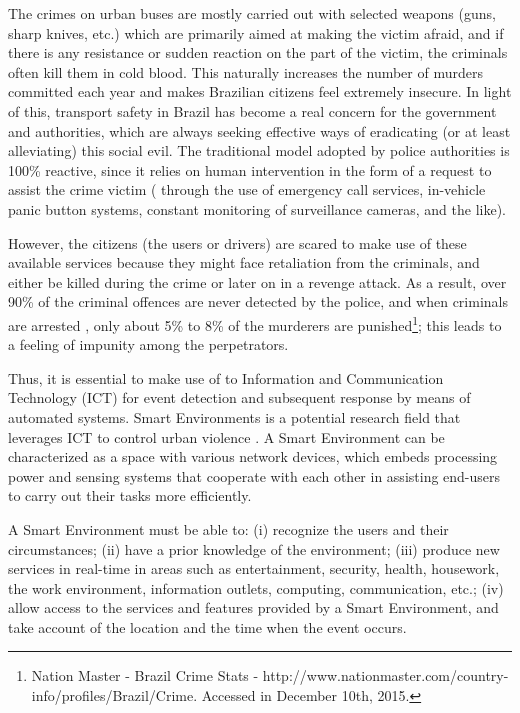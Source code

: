 The crimes on urban buses are mostly carried out with selected weapons (guns, sharp knives, etc.) which are primarily aimed at making the victim afraid, and if there is any resistance or sudden reaction on the part of the victim, the criminals often kill them in cold blood. This naturally increases the number of murders committed each year and makes Brazilian citizens feel extremely insecure. In light of this, transport safety in Brazil has become a real concern for the government and authorities, which are always seeking effective ways of eradicating (or at least alleviating) this social evil. The traditional model adopted by police authorities is 100\% reactive, since it relies on human intervention in the form of a request to assist the crime victim ( through the use of emergency call services, in-vehicle panic button systems, constant monitoring of surveillance cameras, and the like). 

However, the citizens (the users or drivers) are scared to make use of these available services because they might face retaliation from the criminals, and either be killed during the crime or later on in a revenge attack. As a result, over 90\% of the criminal offences are never detected by the police, and when criminals are arrested , only about 5\% to 8\% of the murderers are punished\footnote[4]{Nation Master - Brazil Crime Stats - http://www.nationmaster.com/country-info/profiles/Brazil/Crime. Accessed in December 10th, 2015.}; this leads to a feeling of impunity among the perpetrators.

Thus, it is essential to make use of to Information and Communication Technology (ICT) for event detection and subsequent response by means of automated systems. Smart Environments is a potential research field that leverages ICT to control urban violence \cite{Droege1997}. A Smart Environment can be characterized as a space with various network devices, which embeds processing power and sensing systems that cooperate with each other in assisting end-users to carry out their tasks more efficiently. 

A Smart Environment must be able to: (i) recognize the users and their circumstances; (ii) have a prior knowledge of the environment; (iii) produce new services in real-time in areas such as entertainment, security, health, housework, the work environment, information outlets, computing, communication, etc.; (iv) allow access to the services and features provided by a Smart Environment, and take account of the location and the time when the event occurs.


